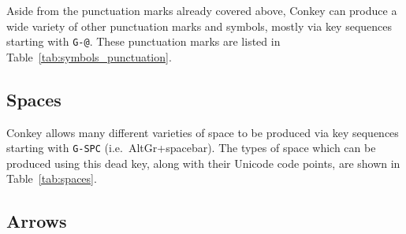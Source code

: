 \documentclass[oneside]{memoir}
\newcommand{\key}{\verb}
\begin{document}
{{{Aside from the punctuation marks already covered above,
  Conkey can produce a wide variety of other punctuation marks and symbols,
  mostly via key sequences starting with \key|G-@|.
These punctuation marks are listed in Table~\ref{tab:symbols_punctuation}.

\subsection{Spaces}
\label{sec:spaces}

Conkey allows many different varieties of space to be produced via key sequences starting with \key|G-SPC| (i.e.\ AltGr+spacebar).
The types of space which can be produced using this dead key, along with their Unicode code points,
  are shown in Table~\ref{tab:spaces}.

\subsection{Arrows}
\label{sec:arrows}

}}}
\end{document}
